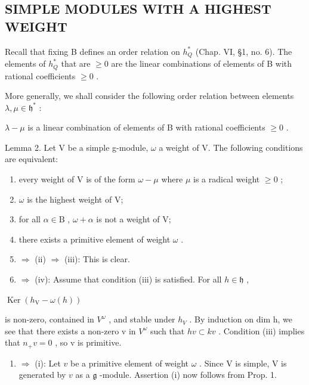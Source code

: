\subsection{SIMPLE MODULES WITH A HIGHEST WEIGHT}

Recall that fixing B defines an order relation on \(h_{Q}^{*}\) (Chap. VI, §1, no. 6). The elements of \(h_{Q}^{*}\) that are \(\geq 0\) are the linear combinations of elements of B with rational coefficients \(\geq 0\) .

More generally, we shall consider the following order relation between elements \(\lambda, \mu \in \mathfrak{h}^*\) :

\(\lambda - \mu\) is a linear combination of elements of B with rational coefficients \(\geq 0\) .

Lemma 2. Let V be a simple g-module, \(\omega\) a weight of V. The following conditions are equivalent:

\begin{enumerate}
\def\labelenumi{(\roman{enumi})}
\item
  every weight of V is of the form \(\omega -\mu\) where \(\mu\) is a radical weight \(\geq 0\) ;
\item
  \(\omega\) is the highest weight of V;
\item
  for all \(\alpha \in \mathrm{B}\) , \(\omega + \alpha\) is not a weight of V;
\item
  there exists a primitive element of weight \(\omega\) .
\item
  \(\Longrightarrow\) (ii) \(\Longrightarrow\) (iii): This is clear.
\item
  \(\Longrightarrow\) (iv): Assume that condition (iii) is satisfied. For all \(h\in \mathfrak{h}\) ,
\end{enumerate}

\(\operatorname {Ker}(h_{\mathrm{V}} - \omega (h))\)

is non-zero, contained in \(V^{\omega}\) , and stable under \(h_{V}\) . By induction on dim h, we see that there exists a non-zero v in \(V^{\omega}\) such that \(h v \subset kv\) . Condition (iii) implies that \(n_{+}v = 0\) , so v is primitive.

\begin{enumerate}
\def\labelenumi{(\roman{enumi})}
\setcounter{enumi}{3}
\tightlist
\item
  \(\Longrightarrow\) (i): Let \(v\) be a primitive element of weight \(\omega\) . Since V is simple, V is generated by \(v\) as a \(\mathfrak{g}\) -module. Assertion (i) now follows from Prop. 1.
\end{enumerate}

